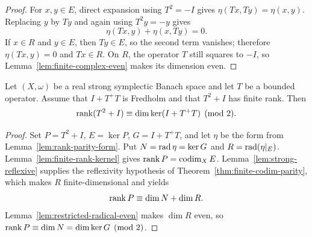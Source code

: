 \begin{proof}
For $x,y\in E$, direct expansion using $T^2=-I$ gives
$\eta(Tx,Ty)=\eta(x,y)$.  Replacing $y$ by $Ty$ and again using $T^2y=-y$ gives
\[
  \eta(Tx,y)+\eta(x,Ty)=0.
\]
If $x\in R$ and $y\in E$, then $Ty\in E$, so the second term vanishes; therefore
$\eta(Tx,y)=0$ and $Tx\in R$.  On $R$, the operator $T$ still squares to $-I$, so
Lemma~\ref{lem:finite-complex-even} makes its dimension even.
\end{proof}

\begin{theorem}\label{thm:general-rank-parity}
Let $(X,\omega)$ be a real strong symplectic Banach space and let $T$ be a bounded operator.
Assume that $I+T^+T$ is Fredholm and that $T^2+I$ has finite rank.  Then
\[
  \operatorname{rank}(T^2+I)\equiv\dim\ker(I+T^+T)\pmod2.
\]
\leanok
\end{theorem}

\begin{proof}
Set $P=T^2+I$, $E=\ker P$, $G=I+T^+T$, and let $\eta$ be the form from
Lemma~\ref{lem:rank-parity-form}.  Put $N=\operatorname{rad}\eta=\ker G$ and $R=\operatorname{rad}(\eta|_E)$.
Lemma~\ref{lem:finite-rank-kernel} gives $\operatorname{rank} P=\operatorname{codim}_XE$.
Lemma~\ref{lem:strong-reflexive} supplies the reflexivity hypothesis of
Theorem~\ref{thm:finite-codim-parity}, which makes $R$ finite-dimensional and yields
\[
  \operatorname{rank} P\equiv\dim N+\dim R.
\]
Lemma~\ref{lem:restricted-radical-even} makes $\dim R$ even, so
$\operatorname{rank} P\equiv\dim N=\dim\ker G\pmod2$.
\end{proof}

